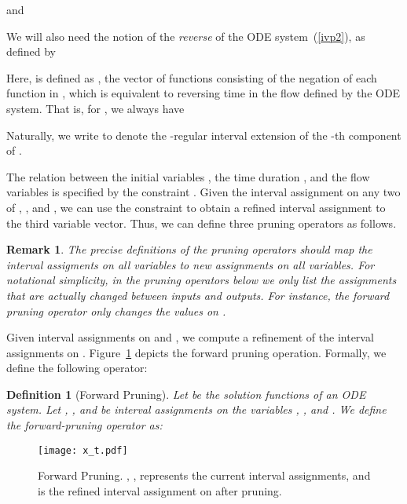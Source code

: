 \documentclass[12pt]{article}
\newtheorem{definition}[theorem]{Definition}
\newtheorem{remark}[theorem]{Remark}
\begin{document}
and

We will also need the notion of the {\em reverse} of the ODE system~(\ref{ivp2}), as defined by

Here,  is defined as , the vector of functions consisting of the negation of each function in , which is equivalent to reversing time in the flow defined by the ODE system. That is, for , we always have

Naturally, we write  to denote the -regular interval extension of the -th component of .
\begin{algorithm}\label{alg:BasicPruning}
\caption{}\label{basic}
\begin{algorithmic}[1]
\Repeat
  \State 
  \State 
  \State 
  \Until{}
  \State \Return{}
\end{algorithmic}
\end{algorithm}


The relation between the initial variables , the time duration , and the flow variables  is specified by the constraint . Given the interval assignment on any two of , , and , we can use the constraint to obtain a refined interval assignment to the third variable vector. Thus, we can define three pruning operators as follows.
\begin{remark}
The precise definitions of the pruning operators should map the interval assigments on all variables to new assignments on all variables. For notational simplicity, in the pruning operators below we only list the assignments that are actually changed between inputs and outputs. For instance, the forward pruning operator only changes the values on . 
\end{remark}
 Given interval assignments on  and , we compute a refinement of the interval assignments on . Figure~\ref{xtp} depicts the forward pruning operation. Formally, we define the following operator:
\begin{definition}[Forward Pruning]
Let  be the solution functions of an ODE system. Let , , and  be interval assignments on the variables , , and . We define the forward-pruning operator as:

\end{definition}
\begin{figure}
\begin{center}
\texttt{[image: x\_t.pdf]}
\end{center}
\caption{Forward Pruning. , ,  represents the current interval assignments, and  is the refined interval assignment on  after pruning.}\label{xtp}
\end{figure}
\end{document}
